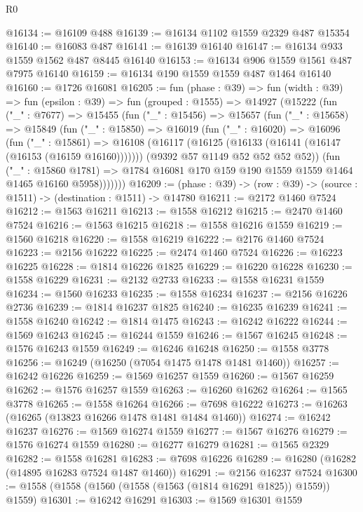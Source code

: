 \begin{lexlean}{R0}
\begin{coremodule}
@16134 := @16109 @488
@16139 := @16134 @1102 @1559 @2329 @487 @15354
@16140 := @16083 @487
@16141 := @16139 @16140
@16147 := @16134 @933 @1559 @1562 @487 @8445 @16140
@16153 := @16134 @906 @1559 @1561 @487 @7975 @16140
@16159 := @16134 @190 @1559 @1559 @487 @1464 @16140
@16160 := @1726 @16081
@16205 := fun (phase : @39) =>
  fun (width : @39) =>
  fun (epsilon : @39) =>
  fun (grouped : @1555) =>
  @14927
    (@15222
      (fun ("_" : @7677) =>
      @15455
        (fun ("_" : @15456) =>
        @15657
          (fun ("_" : @15658) =>
          @15849
            (fun ("_" : @15850) =>
            @16019
              (fun ("_" : @16020) =>
              @16096
                (fun ("_" : @15861) =>
                @16108
                  (@16117 (@16125 (@16133 (@16141 (@16147 (@16153 (@16159 @16160)))))))
                  (@9392 @57 @1149 @52 @52 @52 @52))
                (fun ("_" : @15860 @1781) =>
                @1784 @16081 @170 @159 @190 @1559 @1559 @1464 @1465 @16160 @5958)))))))
@16209 := (phase : @39) -> (row : @39) -> (source : @1511) -> (destination : @1511) -> @14780
@16211 := @2172 @1460 @7524
@16212 := @1563 @16211
@16213 := @1558 @16212
@16215 := @2470 @1460 @7524
@16216 := @1563 @16215
@16218 := @1558 @16216 @1559
@16219 := @1560 @16218
@16220 := @1558 @16219
@16222 := @2176 @1460 @7524
@16223 := @2156 @16222
@16225 := @2474 @1460 @7524
@16226 := @16223 @16225
@16228 := @1814 @16226 @1825
@16229 := @16220 @16228
@16230 := @1558 @16229
@16231 := @2132 @2733
@16233 := @1558 @16231 @1559
@16234 := @1560 @16233
@16235 := @1558 @16234
@16237 := @2156 @16226 @2736
@16239 := @1814 @16237 @1825
@16240 := @16235 @16239
@16241 := @1558 @16240
@16242 := @1814 @1475
@16243 := @16242 @16222
@16244 := @1569 @16243
@16245 := @16244 @1559
@16246 := @1567 @16245
@16248 := @1576 @16243 @1559
@16249 := @16246 @16248
@16250 := @1558 @3778
@16256 := @16249 (@16250 (@7054 @1475 @1478 @1481 @1460))
@16257 := @16242 @16226
@16259 := @1569 @16257 @1559
@16260 := @1567 @16259
@16262 := @1576 @16257 @1559
@16263 := @16260 @16262
@16264 := @1565 @3778
@16265 := @1558 @16264
@16266 := @7698 @16222
@16273 := @16263 (@16265 (@13823 @16266 @1478 @1481 @1484 @1460))
@16274 := @16242 @16237
@16276 := @1569 @16274 @1559
@16277 := @1567 @16276
@16279 := @1576 @16274 @1559
@16280 := @16277 @16279
@16281 := @1565 @2329
@16282 := @1558 @16281
@16283 := @7698 @16226
@16289 := @16280 (@16282 (@14895 @16283 @7524 @1487 @1460))
@16291 := @2156 @16237 @7524
@16300 := @1558 (@1558 (@1560 (@1558 (@1563 (@1814 @16291 @1825)) @1559)) @1559)
@16301 := @16242 @16291
@16303 := @1569 @16301 @1559

\end{coremodule}
\end{lexlean}
